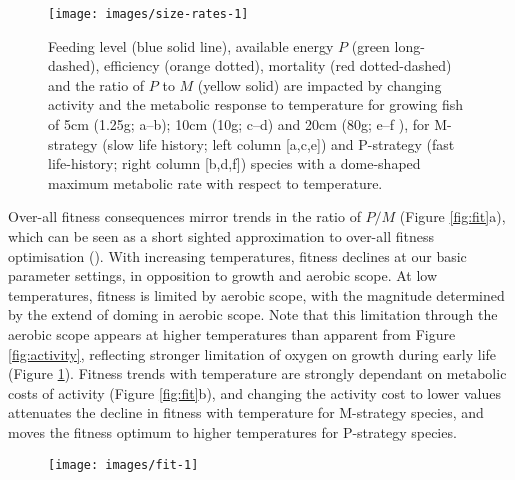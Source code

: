 \documentclass[a4paper, toc=index,abstract=true]{scrartcl}\usepackage[]{graphicx}\usepackage[]{color}
\makeatletter
\def\maxwidth{ %
  \ifdim\Gin@nat@width>\linewidth
    \linewidth
  \else
    \Gin@nat@width
  \fi
}
\makeatother
\begin{document}
\begin{spacing}{1.9}
\begin{figure}

{\centering \texttt{[image: images/size-rates-1]} 

}

\caption[Feeding level (blue solid line), available energy $P$ (green long-dashed), efficiency (orange dotted), mortality (red dotted-dashed) and the ratio of $P$ to $M$ (yellow solid) are impacted by changing activity and the metabolic response to temperature for growing fish of 5cm (1.25g]{Feeding level (blue solid line), available energy $P$ (green long-dashed), efficiency (orange dotted), mortality (red dotted-dashed) and the ratio of $P$ to $M$ (yellow solid) are impacted by changing activity and the metabolic response to temperature for growing fish of 5cm (1.25g; a--b); 10cm (10g; c--d) and 20cm (80g; e--f ), for M-strategy (slow life history; left column [a,c,e]) and P-strategy (fast life-history; right column [b,d,f]) species with a dome-shaped maximum metabolic rate with respect to temperature.}\label{fig:size-rates}
\end{figure}



Over-all fitness consequences mirror trends in the ratio of $P/M$ (Figure \ref{fig:fit}a), which can be seen as a short sighted approximation to over-all fitness optimisation (\cite{sainmont_effective_2015}). With increasing temperatures, fitness declines at our basic parameter settings, in opposition to growth and aerobic scope. At low temperatures, fitness is limited by aerobic scope, with the magnitude determined by the extend of doming in aerobic scope. Note that this limitation through the aerobic scope appears at higher temperatures than apparent from Figure \ref{fig:activity}, reflecting stronger limitation of oxygen on growth during early life (Figure \ref{fig:size-rates}). Fitness trends with temperature are strongly dependant on metabolic costs of activity (Figure \ref{fig:fit}b), and changing the activity cost to lower values attenuates the decline in fitness with temperature for M-strategy species, and moves the fitness optimum to higher temperatures for P-strategy species.



\begin{figure}

{\centering \texttt{[image: images/fit-1]} 

}


\end{figure}
\end{spacing}
\end{document}
